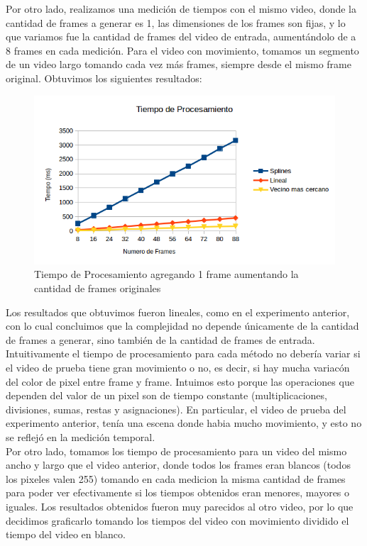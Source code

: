 Por otro lado, realizamos una medición de tiempos con el mismo video, donde la cantidad de frames a generar es 1,   las dimensiones de los frames son fijas, y lo que variamos fue la cantidad de frames del video de entrada, aumentándolo de a 8 frames en cada medición. Para el video con movimiento, tomamos un segmento de un video largo tomando cada vez más frames, siempre desde el mismo frame original. Obtuvimos los siguientes resultados:


\begin{figure}[h!]
  \centering
    \includegraphics[scale= 0.8]{imagenes/aumentandoFramesMessi.png}
  \caption{Tiempo de Procesamiento agregando 1 frame aumentando la cantidad de frames originales}
\end{figure}

Los resultados que obtuvimos fueron lineales, como en el experimento anterior, con lo cual concluimos que la complejidad no depende únicamente de la cantidad de frames a generar, sino también de la cantidad de frames de entrada.\\


Intuitivamente el tiempo de procesamiento para cada método no debería variar si el video de prueba tiene gran movimiento o no, es decir, si hay mucha variacón del color de pixel entre frame y frame. Intuimos esto porque las operaciones que dependen del valor de un pixel son de tiempo constante (multiplicaciones, divisiones, sumas, restas y asignaciones). En particular, el video de prueba del experimento anterior, tenía una escena donde habia mucho movimiento, y esto no se reflejó en la medición temporal. \\

Por otro lado, tomamos los tiempo de procesamiento para un video del mismo ancho y largo que el video anterior, donde todos los frames eran blancos (todos los pixeles valen 255) tomando en cada medicion la misma cantidad de frames para poder ver efectivamente si los tiempos obtenidos eran menores, mayores o iguales. Los resultados obtenidos fueron muy parecidos al otro video, por lo que decidimos graficarlo tomando los tiempos del video con movimiento dividido el tiempo del video en blanco.

